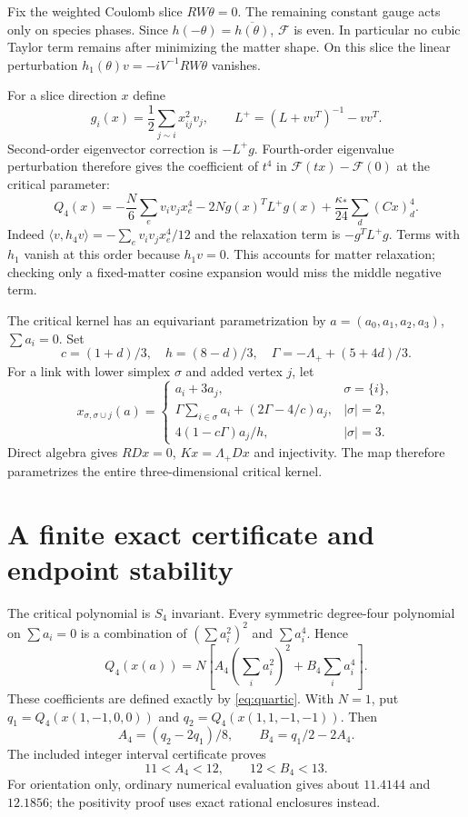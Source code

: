 \documentclass[11pt,a4paper]{article}
\begin{document}
Fix the weighted Coulomb slice $RW\theta=0$. The remaining constant gauge acts only on species phases. Since $h(-\theta)=\overline{h(\theta)}$, $\mathcal F$ is even. In particular no cubic Taylor term remains after minimizing the matter shape. On this slice the linear perturbation $h_1(\theta)v=-iV^{-1}RW\theta$ vanishes.

For a slice direction $x$ define
\[
g_i(x)=\frac12\sum_{j\sim i}x_{ij}^2v_j,
\qquad L^+=(L+vv^T)^{-1}-vv^T.
\]
Second-order eigenvector correction is $-L^+g$. Fourth-order eigenvalue perturbation therefore gives the coefficient of $t^4$ in
$\mathcal F(tx)-\mathcal F(0)$ at the critical parameter:
\begin{equation}
Q_4(x)=-\frac N6\sum_e v_iv_jx_e^4
-2N g(x)^TL^+g(x)
+\frac{\kappa_*}{24}\sum_d(Cx)_d^4.\label{eq:quartic}
\end{equation}
Indeed $\langle v,h_4v\rangle=-\sum_e v_iv_jx_e^4/12$ and the relaxation term is $-g^TL^+g$. Terms with $h_1$ vanish at this order because $h_1v=0$. This accounts for matter relaxation; checking only a fixed-matter cosine expansion would miss the middle negative term.

The critical kernel has an equivariant parametrization by $a=(a_0,a_1,a_2,a_3)$, $\sum a_i=0$. Set
\[
c=(1+d)/3,\quad h=(8-d)/3,\quad
\Gamma=-\Lambda_++(5+4d)/3.
\]
For a link with lower simplex $\sigma$ and added vertex $j$, let
\[
x_{\sigma,\sigma\cup j}(a)=
\begin{cases}
a_i+3a_j,&\sigma=\{i\},\\
\Gamma\sum_{i\in\sigma}a_i+(2\Gamma-4/c)a_j,&|\sigma|=2,\\
4(1-c\Gamma)a_j/h,&|\sigma|=3.
\end{cases}
\]
Direct algebra gives $RDx=0$, $Kx=\Lambda_+Dx$ and injectivity. The map therefore parametrizes the entire three-dimensional critical kernel.

\newpage
\section{A finite exact certificate and endpoint stability}
The critical polynomial is $S_4$ invariant. Every symmetric degree-four polynomial on $\sum a_i=0$ is a combination of $(\sum a_i^2)^2$ and $\sum a_i^4$. Hence
\[
Q_4(x(a))=N\left[A_4\left(\sum_i a_i^2\right)^2+B_4\sum_i a_i^4\right].
\]
These coefficients are defined exactly by \eqref{eq:quartic}. With $N=1$, put
$q_1=Q_4(x(1,-1,0,0))$ and
$q_2=Q_4(x(1,1,-1,-1))$. Then
\[
A_4=(q_2-2q_1)/8,\qquad B_4=q_1/2-2A_4.
\]
The included integer interval certificate proves
\[
\boxed{11<A_4<12,\qquad12<B_4<13.}
\]
For orientation only, ordinary numerical evaluation gives about $11.4144$ and $12.1856$; the positivity proof uses exact rational enclosures instead.
\end{document}
